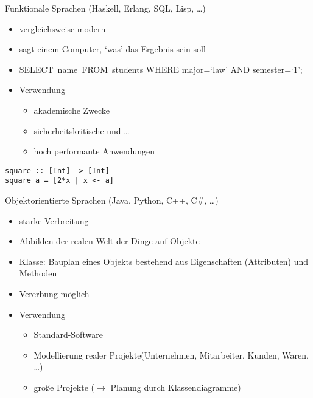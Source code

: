 \begin{frame}[fragile]{Funktionale Sprachen (Haskell, Erlang, SQL, Lisp, \dots)}
    \begin{itemize}
       \item vergleichsweise modern
       \item sagt einem Computer, `was' das Ergebnis sein soll
       \item SELECT name FROM students WHERE major=‘law’ AND semester=‘1’;
       \item Verwendung
        \begin{itemize}
            \item akademische Zwecke
            \item sicherheitskritische und \dots
            \item hoch performante Anwendungen
        \end{itemize}
    \end{itemize}
    \begin{lstlisting}
square :: [Int] -> [Int]
square a = [2*x | x <- a]
    \end{lstlisting}
\end{frame}

\begin{frame}[standout]
    \impvsfunc
\end{frame}

\begin{frame}[fragile]{Objektorientierte Sprachen (Java, Python, C++, C\#, \dots)}
    \begin{itemize}
       \item starke Verbreitung
       \item Abbilden der realen Welt der Dinge auf Objekte
       \item Klasse: Bauplan eines Objekts bestehend aus Eigenschaften (Attributen) und Methoden
       \item Vererbung möglich
       \item Verwendung
        \begin{itemize}
            \item Standard-Software
            \item Modellierung realer Projekte(Unternehmen, Mitarbeiter, Kunden, Waren, \dots)
            \item große Projekte ($\rightarrow$ Planung durch Klassendiagramme)
        \end{itemize}
    \end{itemize}
\end{frame}

